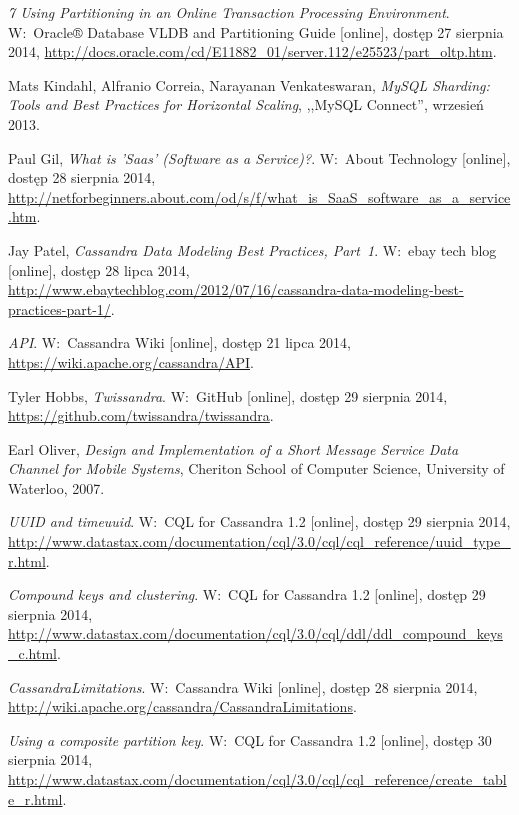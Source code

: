 \begin{thebibliography}{9}
\emph{7 Using Partitioning in an Online Transaction Processing Environment}. W:~Oracle® Database VLDB and Partitioning Guide [online], dostęp 27 sierpnia 2014, \url{http://docs.oracle.com/cd/E11882\_01/server.112/e25523/part\_oltp.htm}.

Mats Kindahl, Alfranio Correia, Narayanan Venkateswaran, \emph{MySQL Sharding: Tools and Best Practices for Horizontal Scaling}, ,,MySQL Connect'', wrzesień 2013.

Paul Gil, \emph{What is 'Saas' (Software as a Service)?}. W:~About Technology [online], dostęp 28 sierpnia 2014, \url{http://netforbeginners.about.com/od/s/f/what\_is\_SaaS\_software\_as\_a\_service.htm}.

Jay Patel, \emph{Cassandra Data Modeling Best Practices, Part~1}. W:~ebay tech blog [online], dostęp 28 lipca 2014, \url{http://www.ebaytechblog.com/2012/07/16/cassandra-data-modeling-best-practices-part-1/}.

\emph{API}. W:~Cassandra Wiki [online], dostęp 21 lipca 2014, \linebreak \url{https://wiki.apache.org/cassandra/API}.

Tyler Hobbs, \emph{Twissandra}. W:~GitHub [online], dostęp 29 sierpnia 2014, \url{https://github.com/twissandra/twissandra}.

Earl Oliver, \emph{Design and Implementation of a Short Message Service Data Channel for Mobile Systems}, Cheriton School of Computer Science, University of Waterloo, 2007.

\emph{UUID and timeuuid}. W:~CQL for Cassandra 1.2 [online], dostęp 29 sierpnia 2014, \url{http://www.datastax.com/documentation/cql/3.0/cql/cql\_reference/uuid\_type\_r.html}.

\emph{Compound keys and clustering}. W:~CQL for Cassandra 1.2 [online], dostęp 29 sierpnia 2014, \url{http://www.datastax.com/documentation/cql/3.0/cql/ddl/ddl\_compound\_keys\_c.html}.

\emph{CassandraLimitations}. W:~Cassandra Wiki [online], dostęp 28 sierpnia 2014, \url{http://wiki.apache.org/cassandra/CassandraLimitations}.

\emph{Using a composite partition key}. W:~CQL for Cassandra 1.2 [online], dostęp 30 sierpnia 2014, \url{http://www.datastax.com/documentation/cql/3.0/cql/cql\_reference/create\_table\_r.html}.


\end{thebibliography}
